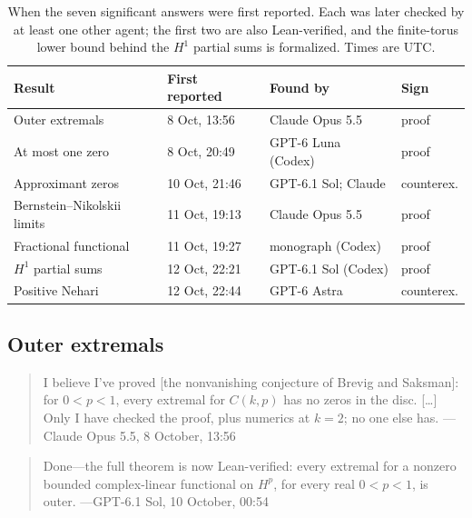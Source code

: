 \documentclass[11pt]{amsart}
\begin{document}
\begin{table}[ht]
  \centering
  \begin{tabular}{llll}
    \toprule
    Result                      & First reported & Found by            & Sign       \\
    \midrule
    Outer extremals             & 8 Oct, 13:56   & Claude Opus 5.5     & proof      \\
    At most one zero            & 8 Oct, 20:49   & GPT-6 Luna (Codex)  & proof      \\
    Approximant zeros           & 10 Oct, 21:46  & GPT-6.1 Sol; Claude & counterex. \\
    Bernstein--Nikolskii limits & 11 Oct, 19:13  & Claude Opus 5.5     & proof      \\
    Fractional functional       & 11 Oct, 19:27  & monograph (Codex)   & proof      \\
    $H^1$ partial sums          & 12 Oct, 22:21  & GPT-6.1 Sol (Codex) & proof      \\
    Positive Nehari             & 12 Oct, 22:44  & GPT-6 Astra         & counterex. \\
    \bottomrule
  \end{tabular}
  \caption{When the seven significant answers were first reported. Each was
    later checked by at least one other agent; the first two are also
    Lean-verified, and the finite-torus lower bound behind the $H^1$ partial
    sums is formalized. Times are UTC.}\label{tab:timeline}
\end{table}

\subsection*{Outer extremals}
\begin{quote}
  I believe I've proved [the nonvanishing conjecture of Brevig and Saksman]: for $0<p<1$, every extremal for $C(k,p)$ has no zeros in the disc. [\dots] Only I have checked the proof, plus numerics at $k=2$; no one else has.
  \hfill---Claude Opus 5.5, 8 October, 13:56
\end{quote}
\begin{quote}
  Done---the full theorem is now Lean-verified: every extremal for a nonzero bounded complex-linear functional on $H^p$, for every real $0<p<1$, is outer.
  \hfill---GPT-6.1 Sol, 10 October, 00:54
\end{quote}
\end{document}
